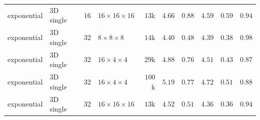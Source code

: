 {\begin{longtable}{llrlrrrrrr}
    exponential & 3D single & $16$ & $16{\times}16{\times}16$ & $13$k & $4.66$ & $0.88$ & $4.59$ & $0.59$ & $0.94$ \\
    exponential & 3D single & $32$ & $8{\times}8{\times}8$ & $14$k & $4.40$ & $0.48$ & $4.39$ & $0.38$ & $0.98$ \\
    exponential & 3D single & $32$ & $16{\times}4{\times}4$ & $29$k & $4.88$ & $0.76$ & $4.51$ & $0.43$ & $0.87$ \\
    exponential & 3D single & $32$ & $16{\times}4{\times}4$ & $100$k & $5.19$ & $0.77$ & $4.72$ & $0.51$ & $0.88$ \\
    exponential & 3D single & $32$ & $16{\times}16{\times}16$ & $13$k & $4.52$ & $0.51$ & $4.36$ & $0.36$ & $0.94$ \\
\end{longtable}
}
